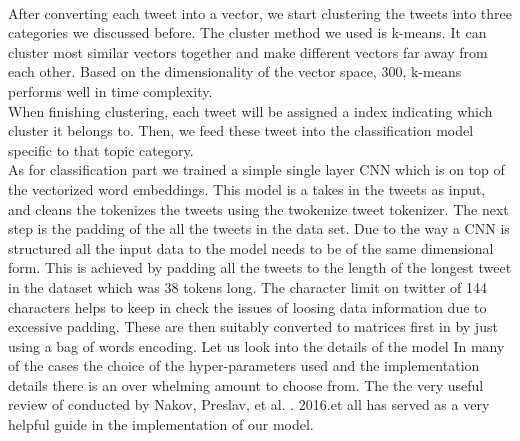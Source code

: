 \documentclass[conference]{IEEEtran}
\begin{document}
\\ \indent
After converting each tweet into a vector, we start clustering the tweets into three categories we discussed before. The cluster method we used is k-means. It can cluster most similar vectors together and make different vectors far away from each other. Based on the dimensionality of the vector space, 300, k-means performs well in time complexity.
\\ \indent
When finishing clustering, each tweet will be assigned a index indicating which cluster it belongs to. Then, we feed these tweet into the classification model specific to that topic category.
\\ \indent
As for classification part we trained a simple single layer CNN which is on top of the vectorized word embeddings. This model is a takes in the tweets as input, and cleans the tokenizes the tweets using the twokenize tweet tokenizer. The next step is the padding of the all the tweets in the data set. Due to the way a CNN is structured all the input data to the model needs to be of the same dimensional form. This is achieved by padding all the tweets to the length of the longest tweet in the dataset which was 38 tokens long. The character limit on twitter of 144 characters helps to keep in check the issues of loosing data information due to excessive padding. These are then suitably converted to matrices first in by just using a bag of words encoding. Let us look into the details of the model In many of the cases the choice of the hyper-parameters used and the implementation details there is an over whelming amount to choose from. The the very useful review of conducted by Nakov, Preslav, et al. . 2016.et all has served as a very helpful guide in the implementation of our model.
\end{document}
